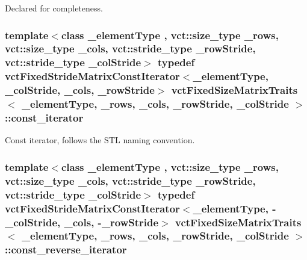 Declared for completeness. \hypertarget{classvct_fixed_size_matrix_traits_a8f7178fb03f45772c705fba16e08065d}{
\subsubsection[{const\-\_\-iterator}]{\setlength{\rightskip}{0pt plus 5cm}template$<$class \-\_\-element\-Type , vct\-::size\-\_\-type \-\_\-rows, vct\-::size\-\_\-type \-\_\-cols, vct\-::stride\-\_\-type \-\_\-row\-Stride, vct\-::stride\-\_\-type \-\_\-col\-Stride$>$ typedef {\bf vct\-Fixed\-Stride\-Matrix\-Const\-Iterator}$<$\-\_\-element\-Type, \-\_\-col\-Stride, \-\_\-cols, \-\_\-row\-Stride$>$ {\bf vct\-Fixed\-Size\-Matrix\-Traits}$<$ \-\_\-element\-Type, \-\_\-rows, \-\_\-cols, \-\_\-row\-Stride, \-\_\-col\-Stride $>$\-::{\bf const\-\_\-iterator}}}\label{classvct_fixed_size_matrix_traits_a8f7178fb03f45772c705fba16e08065d}
Const iterator, follows the S\-T\-L naming convention. \hypertarget{classvct_fixed_size_matrix_traits_a362cff0931f811552609307e80af3eab}{
\subsubsection[{const\-\_\-reverse\-\_\-iterator}]{\setlength{\rightskip}{0pt plus 5cm}template$<$class \-\_\-element\-Type , vct\-::size\-\_\-type \-\_\-rows, vct\-::size\-\_\-type \-\_\-cols, vct\-::stride\-\_\-type \-\_\-row\-Stride, vct\-::stride\-\_\-type \-\_\-col\-Stride$>$ typedef {\bf vct\-Fixed\-Stride\-Matrix\-Const\-Iterator}$<$\-\_\-element\-Type, -\/\-\_\-col\-Stride, \-\_\-cols, -\/\-\_\-row\-Stride$>$ {\bf vct\-Fixed\-Size\-Matrix\-Traits}$<$ \-\_\-element\-Type, \-\_\-rows, \-\_\-cols, \-\_\-row\-Stride, \-\_\-col\-Stride $>$\-::{\bf const\-\_\-reverse\-\_\-iterator}}}\label{classvct_fixed_size_matrix_traits_a362cff0931f811552609307e80af3eab}
